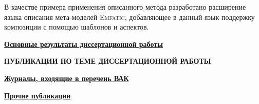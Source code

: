 \documentclass[12pt,a4paper]{article}
\newcommand{\tool}[1]{\textsc{#1}}
\theoremstyle{definition}
\theoremstyle{plain}
\newcommand{\afsection}[1]{\par \begin{center}\textbf{\MakeUppercase{#1}}\end{center}}
\newcommand{\afsubsection}[1]{\par \underline{\textbf{#1}}}
\begin{document}
В качестве примера применения описанного метода разработано расширение языка описания мета-моделей \tool{Emfatic}, добавляющее в данный язык поддержку композиции с помощью шаблонов и аспектов.

\afsubsection{Основные результаты диссертационной работы}


\makeatletter%
\renewcommand\@biblabel[1]{#1.}%
\makeatother%
\renewcommand{\refname}{}%
\afsection{Публикации по теме диссертационной работы}

\begin{center}
\afsubsection{Журналы, входящие в перечень ВАК}
\vspace{-40pt}
\end{center}


\begin{center}
\afsubsection{Прочие публикации}
\vspace{-40pt}
\end{center}


\end{document}
